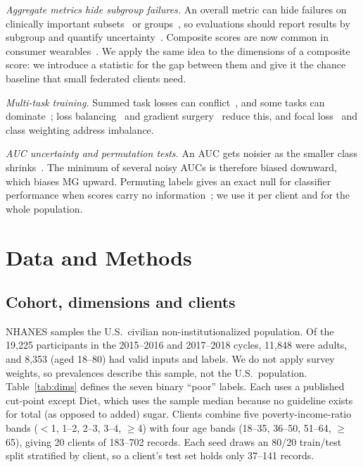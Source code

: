 \emph{Aggregate metrics hide subgroup failures.} An overall metric can hide failures on clinically important subsets~\cite{oakdenrayner2020} or groups~\cite{obermeyer2019}, so evaluations should report results by subgroup and quantify uncertainty~\cite{burnell2023,collins2024}. Composite scores are now common in consumer wearables~\cite{doherty2025}. We apply the same idea to the dimensions of a composite score: we introduce a statistic for the gap between them and give it the chance baseline that small federated clients need.

\emph{Multi-task training.} Summed task losses can conflict~\cite{sener2018}, and some tasks can dominate~\cite{chen2018gradnorm}; loss balancing~\cite{chen2018gradnorm,kendall2018} and gradient surgery~\cite{yu2020pcgrad} reduce this, and focal loss~\cite{lin2017focal} and class weighting address imbalance.

\emph{AUC uncertainty and permutation tests.} An AUC gets noisier as the smaller class shrinks~\cite{hanley1982}. The minimum of several noisy AUCs is therefore biased downward, which biases MG upward. Permuting labels gives an exact null for classifier performance when scores carry no information~\cite{ojala2010}; we use it per client and for the whole population.

\section{Data and Methods}

\subsection{Cohort, dimensions and clients}

NHANES samples the U.S.\ civilian non-institutionalized population. Of the 19,225 participants in the 2015--2016 and 2017--2018 cycles, 11,848 were adults, and 8,353 (aged 18--80) had valid inputs and labels. We do not apply survey weights, so prevalences describe this sample, not the U.S.\ population. Table~\ref{tab:dims} defines the seven binary ``poor'' labels. Each uses a published cut-point except Diet, which uses the sample median because no guideline exists for total (as opposed to added) sugar. Clients combine five poverty-income-ratio bands ($<$1, 1--2, 2--3, 3--4, $\geq$4) with four age bands (18--35, 36--50, 51--64, $\geq$65), giving 20 clients of 183--702 records. Each seed draws an 80/20 train/test split stratified by client, so a client's test set holds only 37--141 records.

